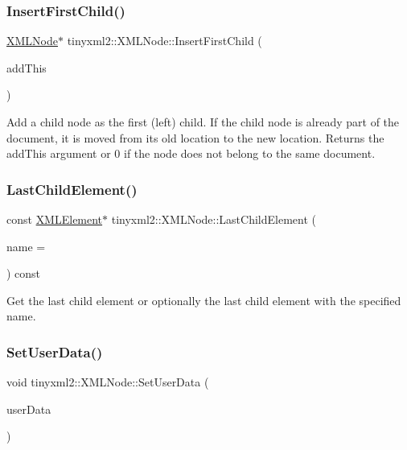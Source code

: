 \subsubsection{\texorpdfstring{InsertFirstChild()}{InsertFirstChild()}}
{\footnotesize\ttfamily \mbox{\hyperlink{classtinyxml2_1_1XMLNode}{X\+M\+L\+Node}}$\ast$ tinyxml2\+::\+X\+M\+L\+Node\+::\+Insert\+First\+Child (\begin{DoxyParamCaption}\item[{\mbox{\hyperlink{classtinyxml2_1_1XMLNode}{X\+M\+L\+Node}} $\ast$}]{add\+This }\end{DoxyParamCaption})}

Add a child node as the first (left) child. If the child node is already part of the document, it is moved from its old location to the new location. Returns the add\+This argument or 0 if the node does not belong to the same document. \mbox{\label{classtinyxml2_1_1XMLNode_a173e9d1341bc56992e2d320a35936551}} 
\subsubsection{\texorpdfstring{LastChildElement()}{LastChildElement()}}
{\footnotesize\ttfamily const \mbox{\hyperlink{classtinyxml2_1_1XMLElement}{X\+M\+L\+Element}}$\ast$ tinyxml2\+::\+X\+M\+L\+Node\+::\+Last\+Child\+Element (\begin{DoxyParamCaption}\item[{const char $\ast$}]{name = {} }\end{DoxyParamCaption}) const}

Get the last child element or optionally the last child element with the specified name. \mbox{\label{classtinyxml2_1_1XMLNode_a002978fc889cc011d143185f2377eca2}} 
\subsubsection{\texorpdfstring{SetUserData()}{SetUserData()}}
{\footnotesize\ttfamily void tinyxml2\+::\+X\+M\+L\+Node\+::\+Set\+User\+Data (\begin{DoxyParamCaption}\item[{void $\ast$}]{user\+Data }\end{DoxyParamCaption})\hspace{0.3cm}{\ttfamily [inline]}}

